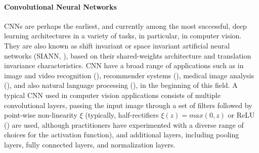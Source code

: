 \documentclass[binding=0.6cm]{sapthesis}
\newcommand{\mycite}[1]{(\cite{#1})}
\begin{document}

\paragraph{Convolutional Neural Networks}
\label{sec:bg.gnn.cnn}
CNNs are perhaps the earliest, and currently among the most successful, deep learning architectures in a variety of tasks, in particular, in computer vision. They are also known as shift invariant or space invariant artificial neural networks (SIANN, \cite{chaman2021-siann}), based on their shared-weights architecture and translation invariance characteristics. CNN have a broad range of applications such as in image and video recognition \mycite{valueva2020-cnn-application}, recommender systems \mycite{dieleman2013-cnn-recommendation}, medical image analysis \mycite{yu2021-cnn-medical}, and also natural language processing \mycite{collobert2008-cnn-nlp}, in the beginning of this field. A typical CNN used in computer vision applications consists of multiple convolutional layers, passing the input image through a set of filters followed by point-wise non-linearity $\xi$ (typically, half-rectifiers $\xi(z) = max(0, z)$ or ReLU \mycite{nairHinton2010-relu} are used, although practitioners have experimented with a diverse range of choices for the activation function), and additional layers, including pooling layers, fully connected layers, and normalization layers.
\end{document}
